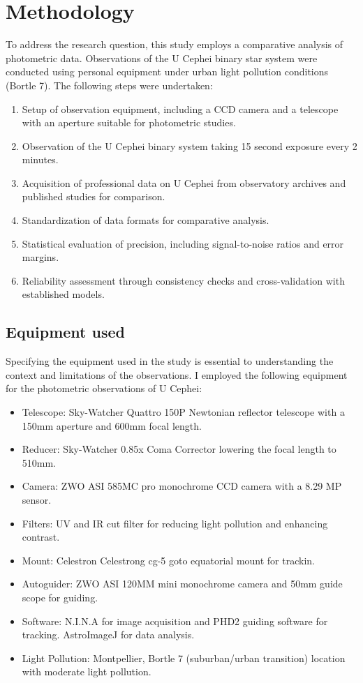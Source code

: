 \documentclass[12pt,a4paper]{article}
\begin{document}
\section{Methodology}
To address the research question, this study employs a comparative analysis of photometric data. Observations of the U Cephei binary star system were conducted using personal equipment under urban light pollution conditions (Bortle 7). The following steps were undertaken:
\begin{enumerate}
    \item Setup of observation equipment, including a CCD camera and a telescope with an aperture suitable for photometric studies.
    \item Observation of the U Cephei binary system taking 15 second exposure every 2 minutes.
    \item Acquisition of professional data on U Cephei from observatory archives and published studies for comparison.
    \item Standardization of data formats for comparative analysis.
    \item Statistical evaluation of precision, including signal-to-noise ratios and error margins.
    \item Reliability assessment through consistency checks and cross-validation with established models.
\end{enumerate}

\subsection{Equipment used}
Specifying the equipment used in the study is essential to understanding the context and limitations of the observations. 
I employed the following equipment for the photometric observations of U Cephei:

\begin{itemize}
    \item Telescope: Sky-Watcher Quattro 150P Newtonian reflector telescope with a 150mm aperture and 600mm focal length.
    \item Reducer: Sky-Watcher 0.85x Coma Corrector lowering the focal length to 510mm.
    \item Camera: ZWO ASI 585MC pro monochrome CCD camera with a 8.29 MP sensor.
    \item Filters: UV and IR cut filter for reducing light pollution and enhancing contrast.
    \item Mount: Celestron Celestrong cg-5 goto equatorial mount for trackin.
    \item Autoguider: ZWO ASI 120MM mini monochrome camera and 50mm guide scope for guiding.
    \item Software: N.I.N.A for image acquisition and PHD2 guiding software for tracking. AstroImageJ for data analysis.
    \item Light Pollution: Montpellier, Bortle 7 (suburban/urban transition) location with moderate light pollution.
\end{itemize}
\end{document}
